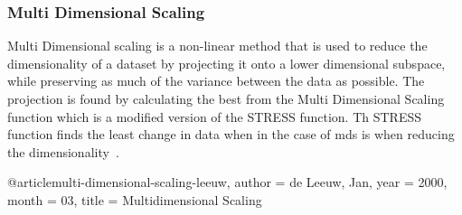 \subsubsection{Multi Dimensional Scaling}\label{subsubsec:multi-dimensional-scaling}
Multi Dimensional scaling is a non-linear method that is used to reduce the dimensionality of a dataset by projecting it onto a lower dimensional subspace, while preserving as much of the variance between the data as possible. The projection is found by calculating the best from the Multi Dimensional Scaling function which is a modified version of the STRESS function. Th STRESS function finds the least change in data when in the case of \gls{mds} is when reducing the dimensionality~\cite{multi-dimensional-scaling-leeuw}. 



@article{multi-dimensional-scaling-leeuw,
author = {de Leeuw, Jan},
year = {2000},
month = {03},
title = {Multidimensional Scaling}
}




